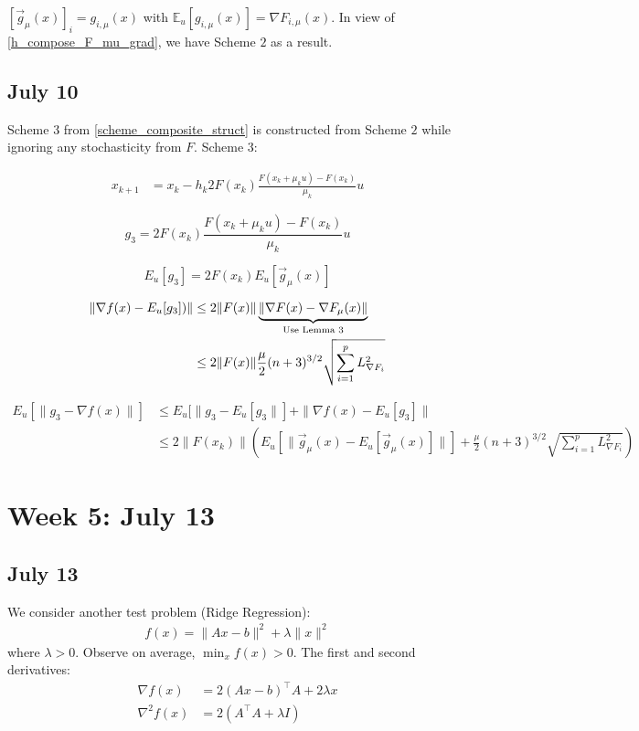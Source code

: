 \documentclass{article}
\begin{document}
$[\vec{g}_{\mu}(x)]_i = g_{i,\mu}(x)$ with $\mathbb{E}_u[g_{i,\mu}(x)] = \nabla F_{i,\mu}(x)$. In view of \eqref{h_compose_F_mu_grad}, we have Scheme $2$ as a result. \newline 

\subsection{July 10}
Scheme $3$ from \ref{scheme_composite_struct} is constructed from Scheme $2$ while ignoring any stochasticity from $F$.
\newpage
Scheme 3:

\begin{align}
x_{k+1} & = x_k - h_k 2F(x_k)\frac{F(x_k+\mu_k u) - F(x_k)}{\mu_k}u
\end{align}

\begin{equation}
g_{3} = 2F(x_k)\frac{F(x_k+\mu_k u) - F(x_k)}{\mu_k}u 
\end{equation}

\begin{equation}
E_{u}[g_{3}] = 2 F(x_k)E_{u}[\vec{g}_{\mu}(x)] 
\end{equation}

\begin{align}
\| \nabla f(x) - E_{u}[g_{3}])\| & \leq 2\|F(x)\| \underbrace{\|\nabla F(x) - \nabla F_{\mu}(x)\|}_{\text{Use Lemma } 3} \notag \\ & \leq 2\|F(x)\| \frac{\mu}{2}(n+3)^{3/2}\sqrt{\sum_{i=1}^p L_{\nabla F_i}^2}
\end{align}

\begin{align}
E_{u}[\|g_{3} - \nabla f(x)\|] &\leq E_{u}[\|g_{3} - E_{u}[g_{3}\|] + \|\nabla f(x) - E_{u}[g_{3}]\|\\
&\leq 2\|F(x_k)\|\left(E_{u}[\|\vec{g}_{\mu}(x )- E_{u}[\vec{g}_{\mu}(x)]\| ] + \frac{\mu}{2}(n+3)^{3/2}\sqrt{\sum_{i=1}^p L_{\nabla F_i}^2} \right)
\end{align}

\section{Week 5: July 13}


\subsection{July 13}

We consider another test problem (Ridge Regression):
\begin{align}
f(x) = \| Ax - b\|^2 + \lambda \|x\|^2
\end{align}
where $\lambda > 0$. Observe on average, $\min_xf(x) > 0$. The first and second derivatives:
\begin{align}
\nabla f(x) & = 2(Ax-b)^\top A + 2\lambda x  \label{ridge_solution}\\ \nabla^2f(x) & = 2(A^\top A + \lambda I)
\end{align}
\end{document}
